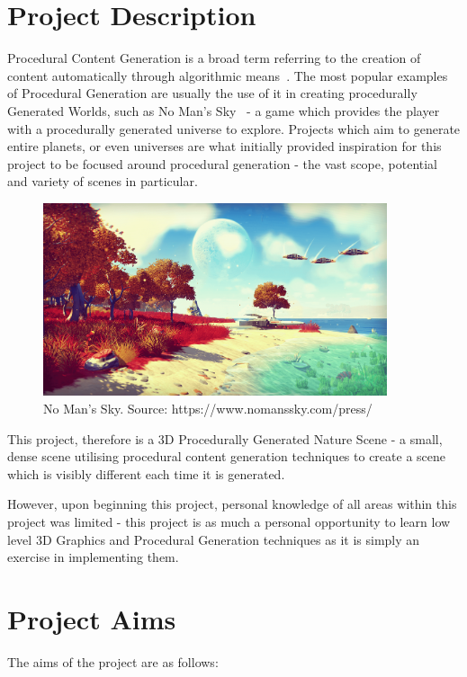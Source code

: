 \documentclass[a4paper,10pt]{report}
\begin{document}
\section{Project Description}

Procedural Content Generation is a broad term referring to the creation of content automatically through algorithmic means~\cite{yannakakis2011experience}. The most popular examples of Procedural Generation are usually the use of it in creating procedurally Generated Worlds, such as No Man's Sky~\cite{nomanssky} - a game which provides the player with a procedurally generated universe to explore. Projects which aim to generate entire planets, or even universes are what initially provided inspiration for this project to be focused around procedural generation - the vast scope, potential and variety of scenes in particular. \medskip


\begin{figure}[h!]
    \centering
  \includegraphics[width=0.9\textwidth]{Images/External/NoMansSky.png}
 \caption{No Man's Sky. Source: https://www.nomanssky.com/press/}
 \label{fig:no_mans_sky}
\end{figure}


This project, therefore is a 3D Procedurally Generated Nature Scene - a small, dense scene utilising procedural content generation techniques to create a  scene which is visibly different each time it is generated. \medskip

However, upon beginning this project, personal knowledge of all areas within this project was limited - this project is as much a personal opportunity to learn low level 3D Graphics and Procedural Generation techniques as it is simply an exercise in implementing them. 

\section{Project Aims}
The aims of the project are as follows:\medskip
\end{document}
